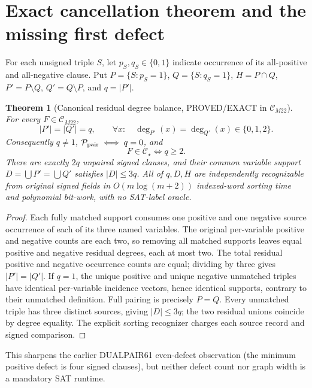\documentclass[10pt]{article}
\newtheorem{theorem}{Theorem}
\begin{document}
\section{Exact cancellation theorem and the missing first defect}
For each unsigned triple \(S\), let \(p_S,q_S\in\{0,1\}\) indicate occurrence of its all-positive and all-negative clause. Put \(P=\{S:p_S=1\}\), \(Q=\{S:q_S=1\}\), \(H=P\cap Q\), \(P'=P\setminus Q\), \(Q'=Q\setminus P\), and \(q=|P'|\).
\begin{theorem}[Canonical residual degree balance, PROVED/EXACT in \(\mathcal C_{M22}\)]
For every \(F\in\mathcal C_{M22}\),
\[
 |P'|=|Q'|=q,\qquad
 \forall x:\quad \deg_{P'}(x)=\deg_{Q'}(x)\in\{0,1,2\}.
\]
Consequently \(q\ne1\), \(\mathcal P_{\rm pair}\iff q=0\), and
\[
F\in\mathcal C_\star\iff q\ge2.
\]
There are exactly \(2q\) unpaired signed clauses, and their common variable support
\(D=\bigcup P'=\bigcup Q'\) satisfies \(|D|\le3q\). All of \(q,D,H\) are independently recognizable from original signed fields in \(O(m\log(m+2))\) indexed-word sorting time and polynomial bit-work, with no SAT-label oracle.
\end{theorem}
\begin{proof}
Each fully matched support consumes one positive and one negative source occurrence of each of its three named variables. The original per-variable positive and negative counts are each two, so removing all matched supports leaves equal positive and negative residual degrees, each at most two. The total residual positive and negative occurrence counts are equal; dividing by three gives \(|P'|=|Q'|\). If \(q=1\), the unique positive and unique negative unmatched triples have identical per-variable incidence vectors, hence identical supports, contrary to their unmatched definition. Full pairing is precisely \(P=Q\). Every unmatched triple has three distinct sources, giving \(|D|\le3q\); the two residual unions coincide by degree equality. The explicit sorting recognizer charges each source record and signed comparison.
\end{proof}
This sharpens the earlier DUALPAIR61 even-defect observation (the minimum positive defect is four signed clauses), but neither defect count nor graph width is a mandatory SAT runtime.
\end{document}
